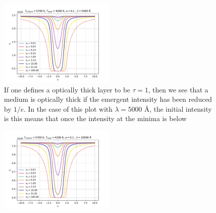 \documentclass[a4paper,11.5pt,]{article}
\begin{document}
\begin{multicols}{2}
\begin{figure}[H]
	\centering
	\includegraphics[width=0.5\textwidth]{SSA/figures/ss1.pdf}
	\caption{If one defines a optically thick layer to be $\tau = 1$, then we see that a medium is optically thick if the emergent intensity has been reduced by $1/e$. In the case of this plot with $\lambda = 5000$ Å, the initial intensity is  this means that once the intensity at the minima is below   }
	\label{fig:23}
\end{figure}




\begin{figure}[H]
	\centering
	\includegraphics[width=0.5\textwidth]{SSA/figures/ss2.pdf}
	\caption{}
	\label{fig:24}
\end{figure}


\end{multicols}
\end{document}
